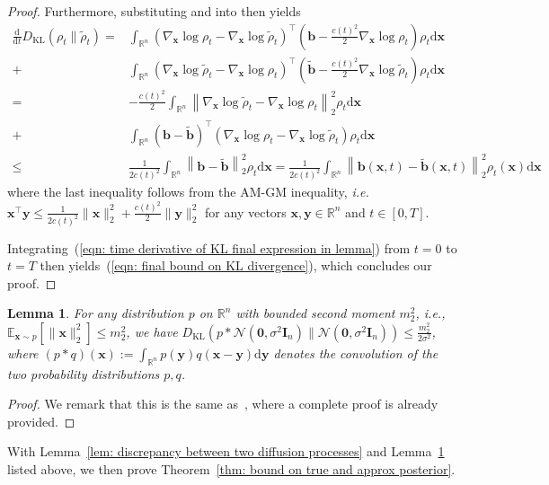 \documentclass{article}
\numberwithin{equation}{section}
\newtheorem{lemma}[theorem]{Lemma}
\def\eqref#1{(\ref{#1})}
\newcommand{\dif}{{\mathrm{d}}}
\def\vb{{\bm{b}}}
\def\vx{{\bm{x}}}
\def\vy{{\bm{y}}}
\def\mI{{\bm{I}}}
\def\gN{{\mathcal{N}}}
\newcommand{\KL}{D_{\mathrm{KL}}}
\begin{document}
\begin{proof}
    Furthermore, substituting and into then yields
    \begin{equation}
    \label{eqn: time derivative of KL final expression in lemma}
    \begin{aligned}
    \frac{\dif}{\dif t}\KL(\rho_t \| \widetilde{\rho}_t) = &\int_{\mathbb{R}^n}\left(\nabla_{\vx}\log\rho_t - \nabla_{\vx}\log\widetilde{\rho}_t\right)^\intercal\left(\vb - \frac{c(t)^2}{2}\nabla_{\vx}\log\rho_t\right)\rho_t\dif\vx\\
    +&\int_{\mathbb{R}^n}\left(\nabla_{\vx}\log\widetilde{\rho}_t - \nabla_{\vx}\log\rho_t\right)^\intercal\left(\widetilde{\vb} - \frac{c(t)^2}{2}\nabla_{\vx}\log\widetilde{\rho}_t\right)\rho_t\dif\vx\\
    = &-\frac{c(t)^2}{2}\int_{\mathbb{R}^n}\left\|\nabla_{\vx}\log\widetilde{\rho}_t - \nabla_{\vx}\log\rho_t\right\|_2^2\rho_t\dif\vx\\
    + &\int_{\mathbb{R}^n}\left(\vb-\widetilde{\vb}\right)^\intercal\left(\nabla_{\vx}\log\rho_t-\nabla_{\vx}\log\widetilde{\rho}_t\right)\rho_t\dif\vx\\
    \leq &\frac{1}{2c(t)^2}\int_{\mathbb{R}^n}\left\|\vb-\widetilde{\vb}\right\|_2^2\rho_t\dif\vx = \frac{1}{2c(t)^2}\int_{\mathbb{R}^n}\left\|\vb(\vx,t)-\widetilde{\vb}(\vx,t)\right\|_2^2\rho_t(\vx)\dif\vx
    \end{aligned}    
    \end{equation}
    where the last inequality follows from the AM-GM inequality, \emph{i.e.} $\vx^\intercal\vy \leq \frac{1}{2c(t)^2}\|\vx\|_2^2 + \frac{c(t)^2}{2}\|\vy\|_2^2$ for any vectors $\vx,\vy \in\mathbb{R}^n$ and $t \in [0,T]$. 

    Integrating~\eqref{eqn: time derivative of KL final expression in lemma} from $t=0$ to $t=T$ then yields~\eqref{eqn: final bound on KL divergence}, which concludes our proof. 
\end{proof}
\begin{lemma}
\label{lem: convergence of the forward process}
For any distribution $p$ on $\mathbb{R}^n$ with bounded second moment $m_2^2$, \emph{i.e.}, $\mathbb{E}_{\vx \sim p}[\|\vx\|_{2}^2] \leq m_2^2$, we have $\KL\left(p \ast \gN(\boldsymbol{0},\sigma^2\mI_n) \| \gN(\boldsymbol{0},\sigma^2\mI_n)\right) \leq \frac{m_2^2}{2\sigma^2}$, where $(p \ast q)(\vx) := \int_{\mathbb{R}^n}p(\vy)q(\vx-\vy)\dif\vy$ denotes the convolution of the two probability distributions $p,q$. 
\end{lemma}
\begin{proof}
We remark that this is the same as~\cite[Lemma 10]{wang2024evaluating}, where a complete proof is already provided. 
\end{proof}
With Lemma~\ref{lem: discrepancy between two diffusion processes} and Lemma~\ref{lem: convergence of the forward process} listed above, we then prove Theorem~\ref{thm: bound on true and approx posterior}. 
\end{document}
